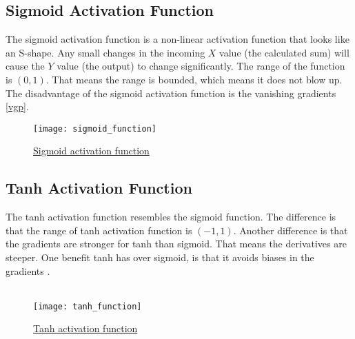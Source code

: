 \subsection{Sigmoid Activation Function}
The sigmoid activation function is a non-linear activation function that looks like an S-shape. Any small changes in the incoming $X$ value (the calculated sum) will cause the $Y$ value (the output) to change significantly. The range of the function is $(0,1)$. That means the range is bounded, which means it does not blow up. The disadvantage of the sigmoid activation function is the vanishing gradients \ref{vgp}.\\

\begin{figure}[!htb]
    \texttt{[image: sigmoid\_function]}
    \caption{\href{https://www.researchgate.net/profile/Stefano_Romanazzi2/publication/325226633/figure/download/fig7/AS:627667619545098@1526659030915/Plot-of-the-sigmoid-function.png}{Sigmoid activation function} }
\end{figure}

\pagebreak

\subsection{Tanh Activation Function}
The tanh activation function resembles the sigmoid function. The difference is that the range of tanh activation function is $(-1,1)$. Another difference is that the gradients are stronger for tanh than sigmoid. That means the derivatives are steeper. One benefit tanh has over sigmoid, is that it  avoids biases in the gradients \cite{Tan_h}.\\\\

\begin{figure}[!htb]
    \texttt{[image: tanh\_function]}
    \caption{\href{https://qph.fs.quoracdn.net/main-qimg-8aa9a4ad89a6a58b86aba86b136261f9}{Tanh activation function} }
\end{figure}

